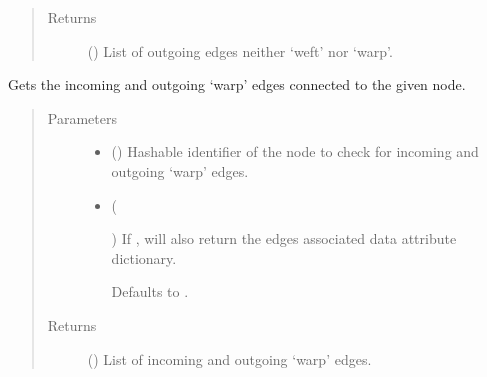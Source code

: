 \documentclass[letterpaper,10pt,english]{sphinxmanual}
\begin{document}
\begin{fulllineitems}
\begin{fulllineitems}
\begin{quote}
\begin{description}
\item[{Returns}] \leavevmode
{} () \textendash{} List of outgoing edges neither ‘weft’ nor ‘warp’.

\end{description}\end{quote}

\end{fulllineitems}


\begin{fulllineitems}
\label{\detokenize{cockatoo:cockatoo.KnitDiNetwork.node_warp_edges}}
Gets the incoming and outgoing ‘warp’ edges connected to the given
node.
\begin{quote}\begin{description}
\item[{Parameters}] \leavevmode\begin{itemize}
\item {} 
 () \textendash{} Hashable identifier of the node to check for incoming and outgoing
‘warp’ edges.

\item {} 
 (%
\begin{footnote}[149]\sphinxAtStartFootnote
{}
%
\end{footnote}\sphinxstyleliteralemphasis{\sphinxupquote{, }}) \textendash{} 
If , will also return the edges associated data attribute
dictionary.

Defaults to .


\end{itemize}

\item[{Returns}] \leavevmode
{} () \textendash{} List of incoming and outgoing ‘warp’ edges.


\end{description}
\end{quote}
\end{fulllineitems}
\end{fulllineitems}
\end{document}
